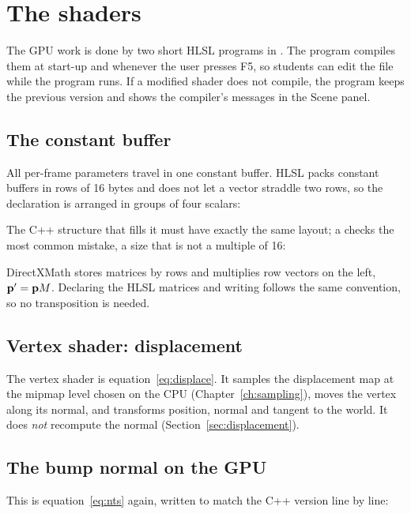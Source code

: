 \chapter{The shaders}
\label{ch:shaders}

The GPU work is done by two short HLSL programs in . The program compiles
them at start-up and whenever the user presses F5, so students can edit the file while the
program runs. If a modified shader does not compile, the program keeps the previous version and
shows the compiler's messages in the Scene panel.

\section{The constant buffer}
All per-frame parameters travel in one constant buffer. HLSL packs constant buffers in rows of
16 bytes and does not let a vector straddle two rows, so the declaration is arranged in groups of
four scalars:


The C++ structure that fills it must have exactly the same layout; a 
checks the most common mistake, a size that is not a multiple of 16:


DirectXMath stores matrices by rows and multiplies row vectors on the left, $\mathbf{p}'=\mathbf{p}M$.
Declaring the HLSL matrices  and writing  follows the same
convention, so no transposition is needed.

\section{Vertex shader: displacement}
\label{sec:vs}
The vertex shader is equation~\eqref{eq:displace}. It samples the displacement map at the mipmap
level  chosen on the CPU (Chapter~\ref{ch:sampling}), moves the vertex along its
normal, and transforms position, normal and tangent to the world. It does \emph{not} recompute
the normal (Section~\ref{sec:displacement}).


\section{The bump normal on the GPU}
This is equation~\eqref{eq:nts} again, written to match the C++ version line by line:

